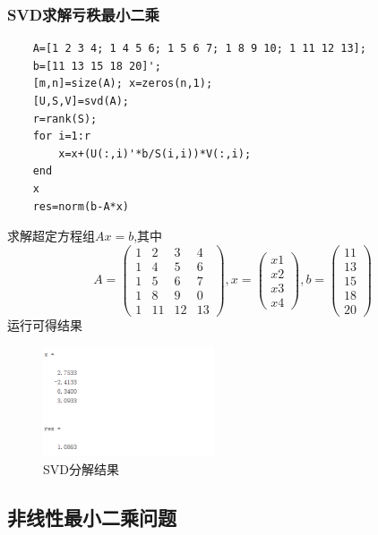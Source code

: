 \documentclass[12pt]{article} %
\begin{document}
	\subsubsection{SVD求解亏秩最小二乘}
	\begin{lstlisting}
	A=[1 2 3 4; 1 4 5 6; 1 5 6 7; 1 8 9 10; 1 11 12 13];
	b=[11 13 15 18 20]';
	[m,n]=size(A); x=zeros(n,1);
	[U,S,V]=svd(A);
	r=rank(S);
	for i=1:r
		x=x+(U(:,i)'*b/S(i,i))*V(:,i);
	end
	x
	res=norm(b-A*x)
	\end{lstlisting}
	\indent 求解超定方程组$Ax=b$,其中
$$A=\begin{pmatrix}
	1 & 2 & 3 & 4\\
	1 & 4 & 5 & 6\\
	1 & 5 & 6 & 7\\
	1 & 8 & 9 & 0\\
	1 & 11 & 12& 13
\end{pmatrix},
x=\begin{pmatrix}
	x1\\
	x2\\
	x3\\
	x4
\end{pmatrix},
b=\begin{pmatrix}
	11\\
	13\\
	15\\
	18\\
	20
\end{pmatrix}$$
	\indent 运行可得结果
	\begin{figure}[ht]
	\centering
	\includegraphics[width=0.45\textwidth]{svd.png}
	\caption{SVD分解结果}
	\label{fig:fig1}
	\end{figure}
	\subsection{非线性最小二乘问题}
\end{document}
